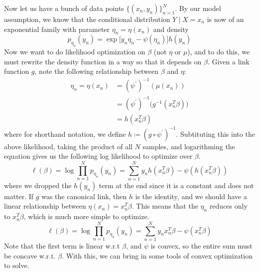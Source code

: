   Now let us have a bunch of data points $\{(x_n, y_n)\}_{n=1}^N$. By our model assumption, we know that the conditional distribution $Y \mid X = x_n$ is now of an exponential family with parameter $\eta_n = \eta (x_n)$ and density 
  \[p_{\eta_n} (y_n) = \exp \big[ y_n \eta_n - \psi(\eta_n) \big] h(y_n)\]
  Now we want to do likelihood optimization on $\beta$ (not $\eta$ or $\mu$), and to do this, we must rewrite the density function in a way so that it depends on $\beta$. Given a link function $g$, note the following relationship between $\beta$ and $\eta$: 
  \begin{align*}
      \eta_n = \eta (x_n) & = (\psi^\prime)^{-1} (\mu (x_n)) \\
      & = (\psi^{\prime})^{-1} \big( g^{-1} (x_n^T \beta )\big) \\
      & = h(x_n^T \beta) 
  \end{align*}
  where for shorthand notation, we define $h \coloneqq (g \circ \psi^\prime)^{-1}$. Subtituting this into the above likelihood, taking the product of all $N$ samples, and logarithming the equation gives us the following log likelihood to optimize over $\beta$. 
  \[\ell(\beta) = \log \prod_{n=1}^N p_{\eta_n} (y_n) = \sum_{n=1}^N y_n h(x_n^T \beta)  - \psi(h(x_n^T \beta) )\]
  where we dropped the $h(y_n)$ term at the end since it is a constant and does not matter. If $g$ was the canonical link, then $h$ is the identity, and we should have a linear relationship between $\eta (x_n) = x_n^T \beta$. This means that the $\eta_n$ reduces only to $x_n^T \beta$, which is much more simple to optimize. 
  \[\ell(\beta) = \log \prod_{n=1}^N p_{\eta_n} (y_n) = \sum_{n=1}^N y_n x_n^T \beta - \psi(x_n^T \beta)\]
  Note that the first term is linear w.r.t $\beta$, and $\psi$ is convex, so the entire sum must be concave w.r.t. $\beta$. With this, we can bring in some tools of convex optimization to solve. 


